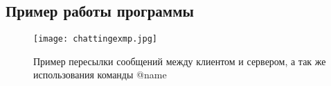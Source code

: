 \documentclass{article}
\begin{document}
\subsection{Пример работы программы}
\begin{figure}[H]
	\begin{flushleft}
		\centerline{\texttt{[image: chattingexmp.jpg]}}
		\caption{Пример пересылки сообщений между клиентом и сервером, а так же использования команды @name}
	\end{flushleft}
\end{figure}
\end{document}

